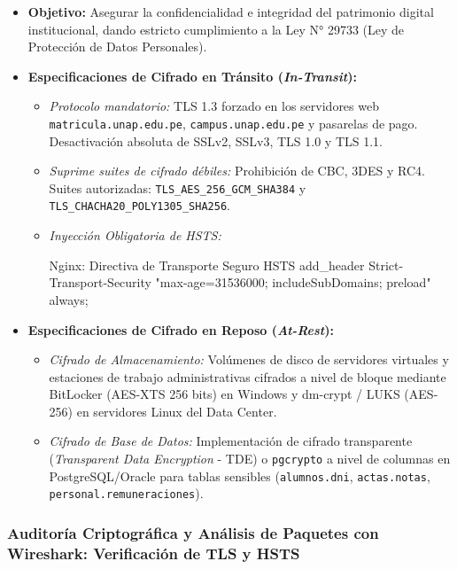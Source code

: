 \begin{itemize}
    \item \textbf{Objetivo:} Asegurar la confidencialidad e integridad del patrimonio digital institucional, dando estricto cumplimiento a la Ley N° 29733 (Ley de Protección de Datos Personales).
    \item \textbf{Especificaciones de Cifrado en Tránsito (\textit{In-Transit}):}
    \begin{itemize}
        \item \textit{Protocolo mandatorio:} TLS 1.3 forzado en los servidores web \texttt{matricula.unap.edu.pe}, \texttt{campus.unap.edu.pe} y pasarelas de pago. Desactivación absoluta de SSLv2, SSLv3, TLS 1.0 y TLS 1.1.
        \item \textit{Suprime suites de cifrado débiles:} Prohibición de CBC, 3DES y RC4. Suites autorizadas: \texttt{TLS\_AES\_256\_GCM\_SHA384} y \texttt{TLS\_CHACHA20\_POLY1305\_SHA256}.
        \item \textit{Inyección Obligatoria de HSTS:}
        
\begin{cmdbox}{Nginx: Directiva de Transporte Seguro HSTS}
add_header Strict-Transport-Security "max-age=31536000; includeSubDomains; preload" always;
\end{cmdbox}
    \end{itemize}
    \item \textbf{Especificaciones de Cifrado en Reposo (\textit{At-Rest}):}
    \begin{itemize}
        \item \textit{Cifrado de Almacenamiento:} Volúmenes de disco de servidores virtuales y estaciones de trabajo administrativas cifrados a nivel de bloque mediante BitLocker (AES-XTS 256 bits) en Windows y dm-crypt / LUKS (AES-256) en servidores Linux del Data Center.
        \item \textit{Cifrado de Base de Datos:} Implementación de cifrado transparente (\textit{Transparent Data Encryption} - TDE) o \texttt{pgcrypto} a nivel de columnas en PostgreSQL/Oracle para tablas sensibles (\texttt{alumnos.dni}, \texttt{actas.notas}, \texttt{personal.remuneraciones}).
    \end{itemize}
\end{itemize}

\newpage
\subsubsection{Auditoría Criptográfica y Análisis de Paquetes con Wireshark: Verificación de TLS y HSTS}\label{subsubsec:wireshark_tls_audit}

